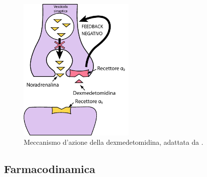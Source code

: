 \begin{figure} [t]
    \centering
    \includegraphics[width=0.5\textwidth]{Figure/dexfigpdf.pdf}
    \caption{Meccanismo d'azione della dexmedetomidina, adattata da \cite{Gertler2001}.}
    \label{fig:DEX}
\end{figure}

\subsection*{Farmacodinamica}

